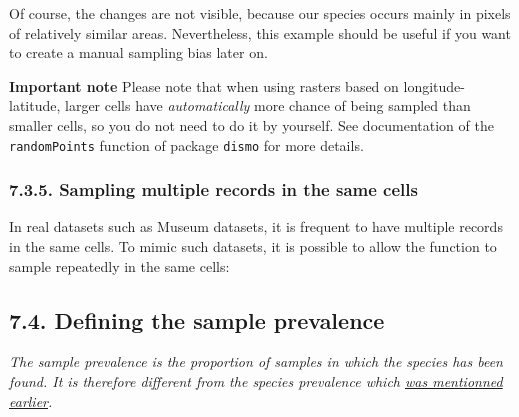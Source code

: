 \documentclass[]{article}
\newenvironment{Shaded}{\begin{snugshade}}{\end{snugshade}}
\newcommand{\KeywordTok}[1]{\textcolor[rgb]{0.13,0.29,0.53}{\textbf{#1}}}
\newcommand{\DataTypeTok}[1]{\textcolor[rgb]{0.13,0.29,0.53}{#1}}
\newcommand{\DecValTok}[1]{\textcolor[rgb]{0.00,0.00,0.81}{#1}}
\newcommand{\StringTok}[1]{\textcolor[rgb]{0.31,0.60,0.02}{#1}}
\newcommand{\CommentTok}[1]{\textcolor[rgb]{0.56,0.35,0.01}{\textit{#1}}}
\newcommand{\OtherTok}[1]{\textcolor[rgb]{0.56,0.35,0.01}{#1}}
\newcommand{\OperatorTok}[1]{\textcolor[rgb]{0.81,0.36,0.00}{\textbf{#1}}}
\newcommand{\NormalTok}[1]{#1}
\begin{document}
Of course, the changes are not visible, because our species occurs
mainly in pixels of relatively similar areas. Nevertheless, this example
should be useful if you want to create a manual sampling bias later on.

\textbf{Important note} Please note that when using rasters based on
longitude-latitude, larger cells have \emph{automatically} more chance
of being sampled than smaller cells, so you do not need to do it by
yourself. See documentation of the \texttt{randomPoints} function of
package \texttt{dismo} for more details.

\subsubsection{7.3.5. Sampling multiple records in the same
cells}\label{sampling-multiple-records-in-the-same-cells}

In real datasets such as Museum datasets, it is frequent to have
multiple records in the same cells. To mimic such datasets, it is
possible to allow the function to sample repeatedly in the same cells:

\begin{Shaded}
\end{Shaded}

\hypertarget{defining-the-sample-prevalence}{\subsection{7.4. Defining
the sample prevalence}\label{defining-the-sample-prevalence}}

\emph{The sample prevalence is the proportion of samples in which the
species has been found. It is therefore different from the species
prevalence which
\protect\hyperlink{conversion-to-presence-absence-based-on-a-value-of-species-prevalence}{was
mentionned earlier}.}
\end{document}
